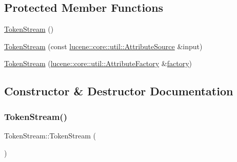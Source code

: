 \subsection*{Protected Member Functions}
\begin{DoxyCompactItemize}
\item 
\mbox{\hyperlink{classlucene_1_1core_1_1analysis_1_1TokenStream_aa9190a1864f989c530aa6c470750d2d8}{Token\+Stream}} ()
\item 
\mbox{\hyperlink{classlucene_1_1core_1_1analysis_1_1TokenStream_a225edeafcbb8da438c1e4ce156357bb6}{Token\+Stream}} (const \mbox{\hyperlink{classlucene_1_1core_1_1util_1_1AttributeSource}{lucene\+::core\+::util\+::\+Attribute\+Source}} \&input)
\item 
\mbox{\hyperlink{classlucene_1_1core_1_1analysis_1_1TokenStream_ae8358809645d3dff705d514cac50ea17}{Token\+Stream}} (\mbox{\hyperlink{classlucene_1_1core_1_1util_1_1AttributeFactory}{lucene\+::core\+::util\+::\+Attribute\+Factory}} \&\mbox{\hyperlink{classlucene_1_1core_1_1util_1_1AttributeSource_a1376420a752f337a0fdb582bdf160eba}{factory}})
\end{DoxyCompactItemize}


\subsection{Constructor \& Destructor Documentation}
\mbox{\label{classlucene_1_1core_1_1analysis_1_1TokenStream_aa9190a1864f989c530aa6c470750d2d8}} 
\subsubsection{\texorpdfstring{Token\+Stream()}{TokenStream()}\hspace{0.1cm}{\footnotesize\ttfamily [1/3]}}
{\footnotesize\ttfamily Token\+Stream\+::\+Token\+Stream (\begin{DoxyParamCaption}{ }\end{DoxyParamCaption})\hspace{0.3cm}{\ttfamily [protected]}}

\mbox{\label{classlucene_1_1core_1_1analysis_1_1TokenStream_a225edeafcbb8da438c1e4ce156357bb6}} 
